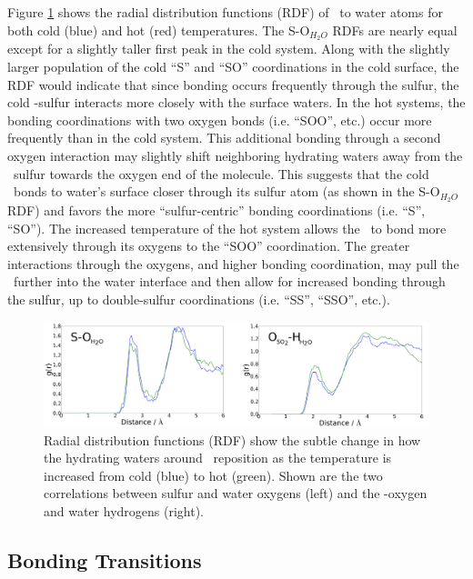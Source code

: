 Figure \ref{fig:rdf} shows the radial distribution functions (RDF) of \suldiox~to water atoms for both cold (blue) and hot (red) temperatures. The S-O$_{H_2O}$ RDFs are nearly equal except for a slightly taller first peak in the cold system. Along with the slightly larger population of the cold ``S'' and ``SO'' coordinations in the cold surface, the RDF would indicate that since bonding occurs frequently through the sulfur, the cold \suldiox-sulfur interacts more closely with the surface waters. In the hot systems, the bonding coordinations with two oxygen bonds (i.e. ``SOO'', etc.) occur more frequently than in the cold system. This additional bonding through a second oxygen interaction may slightly shift neighboring hydrating waters away from the \suldiox~sulfur towards the oxygen end of the molecule. This suggests that the cold \suldiox~bonds to water's surface closer through its sulfur atom (as shown in the S-O$_{H_2O}$ RDF) and favors the more ``sulfur-centric'' bonding coordinations (i.e. ``S'', ``SO''). The increased temperature of the hot system allows the \suldiox~to bond more extensively through its oxygens to the ``SOO'' coordination. The greater interactions through the oxygens, and higher bonding coordination, may pull the \suldiox~further into the water interface and then allow for increased bonding through the sulfur, up to double-sulfur coordinations (i.e. ``SS'', ``SSO'', etc.).

\begin{figure}[h!]
	\begin{center}
		\includegraphics[scale=1.0]{images/rdf/rdf-small.png}
		\caption{Radial distribution functions (RDF) show the subtle change in how the hydrating waters around \suldiox~reposition as the temperature is increased from cold (blue) to hot (green). Shown are the two correlations between sulfur and water oxygens (left) and the \suldiox-oxygen and water hydrogens (right).}
		\label{fig:rdf}
	\end{center}
\end{figure}

\subsection {Bonding Transitions}

